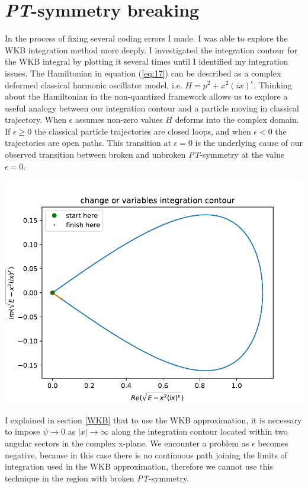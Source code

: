\documentclass[10pt, a4paper, singlespacing]{report}
\newenvironment{Figure}
    {\par\medskip\noindent\minipage{\linewidth}}
    {\endminipage\par\medskip}
\newcommand\PT{\emph{PT}}
\begin{document}
\section{\PT-symmetry breaking}\label{PT breaking}
In the process of fixing several coding errors I made. I was able to explore the WKB integration method more deeply. I investigated the integration contour for the WKB integral by plotting it several times until I identified my integration issues. The Hamiltonian in equation (\ref{eq:17}) can be described as a complex deformed classical harmonic oscillator model, i.e. $H = p^2 + x^2(ix)^{\epsilon}$. Thinking about the Hamiltonian in the non-quantized framework allows us to explore a useful analogy between our integration contour and a particle moving in classical trajectory. When $\epsilon$ assumes non-zero values $H$ deforms into the complex domain\cite{BenderPT}. If $\epsilon \geq 0$ the classical particle trajectories are closed loops, and when $\epsilon < 0$ the trajectories are open paths. This transition at $\epsilon = 0$ is the underlying cause of our observed transition between broken and unbroken \PT-symmetry at the value $\epsilon = 0$.
\begin{Figure}
 \centering
 \includegraphics[width=0.75\linewidth]{integration_contour.pdf}
\end{Figure}
I explained in section \ref{WKB} that to use the WKB approximation, it is necessary to impose $\psi \rightarrow 0$ as $|x| \rightarrow \infty$ along the integration contour located within two angular sectors in the complex x-plane. We encounter a problem as $\epsilon$ becomes negative, because in this case there is no continuous path joining the limits of integration used in the WKB approximation, therefore we cannot use this technique in the region with broken \PT-symmetry.
\end{document}
